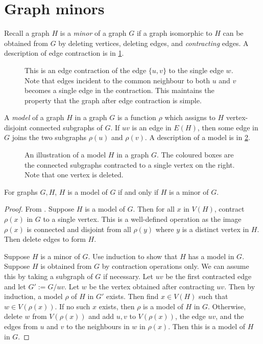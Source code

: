 \section{Graph minors}
Recall a graph \(H\) is a \textit{minor} of a graph \(G\) if a graph isomorphic to \(H\) can be obtained from \(G\) by deleting vertices, deleting edges, and \textit{contracting} edges. A description of edge contraction is in \cref{fig:edge_contraction}.
\begin{figure}[h!]
	\centering
	
	\caption[Edge contraction]{This is an edge contraction of the edge $\{u, v\}$ to the single edge $w$. Note that edges incident to the common neighbour to both $u$ and $v$ becomes a single edge in the contraction. This maintains the property that the graph after edge contraction is simple.}\label{fig:edge_contraction}
\end{figure}

A \textit{model} of a graph \(H\) in a graph \(G\) is a function $\rho$ which assigns to \(H\) vertex-disjoint connected subgraphs of \(G\). If $uv$ is an edge in \(E(H)\), then some edge in \(G\) joins the two subgraphs \(\rho(u)\) and \(\rho(v)\). A description of a model is in \cref{fig:model_of_P5}.
\begin{figure}[h!]
	\centering
	
	\caption[A model $H$ in a graph $G$.]{An illustration of a model $H$ in a graph $G$. The coloured boxes are the connected subgraphs contracted to a single vertex on the right. Note that one vertex is deleted.}\label{fig:model_of_P5}
\end{figure}

\begin{lemma}
	For graphs $G, H$, \(H\) is a model of \(G\) if and only if $H$ is a minor of $G$.
\end{lemma}

\begin{proof}
	From \textcite{norinMath599GraphMinors2017}. Suppose \(H\) is a model of \(G\). Then for all \(x\) in \(V(H)\), contract \(\rho(x)\) in \(G\) to a single vertex. This is a well-defined operation as the image $\rho(x)$ is connected and disjoint from all $\rho(y)$ where $y$ is a distinct vertex in $H$. Then delete edges to form \(H\).

	Suppose $H$ is a minor of $G$. Use induction to show that \(H\) has a model in \(G\). Suppose \(H\) is obtained from \(G\) by contraction operations only. We can assume this by taking a subgraph of \(G\) if necessary. Let \(uv\) be the first contracted edge and let \(G' := G / uv\). Let \(w\) be the vertex obtained after contracting \(uv\). Then by induction, a model \(\rho\) of \(H\) in \(G'\) exists. Then find $x \in V(H)$ such that $w \in V(\rho(x))$. If no such $x$ exists, then $\rho$ is a model of $H$ in $G$. Otherwise, delete \(w\) from \(V(\rho(x)) \) and add $u, v$ to $V(\rho(x))$, the edge $uv$, and the edges from $u$ and $v$ to the neighbours in $w$ in $\rho(x)$. Then this is a model of \(H\) in \(G\). 
\end{proof}